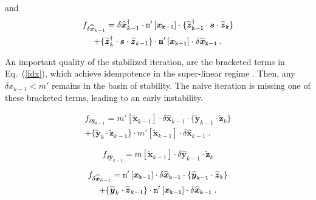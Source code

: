 \documentclass[letterpaper,twocolumn,amsmath,amsfont,amssymb,english,aps,jcp,preprintnumbers,groupaddress,nofootinbib,tightenlines]{revtex4}
\newcommand{\mat}[1]{\boldsymbol{#1}}
\newcommand{\mmat}[1]{\widetilde{\boldsymbol{#1}}}
\begin{document}
and 
\begin{multline} \label{fdx}
f_{\delta \widehat{\mat{x}}_{k-1}} 
= \delta \widehat{\mat{x}}^\dagger_{k-1} \cdot   \tt{m}'\left[\mat{x}_{k-1} \right] \cdot 
\{\widetilde{\mat{z}}^\dagger_{k-1}  \cdot \mat{s} \cdot \widetilde{\mat{z}}_{k} \}  \\
+ \{ \widetilde{\mat{z}}^\dagger_{k} \cdot \mat{s} \cdot  \widetilde{\mat{z}}_{k-1} \} 
\cdot \tt{m}'\left[\mat{x}_{k-1} \right]  \cdot \delta \widehat{\mat{x}}_{k-1}  \;.
\end{multline}

An important quality of the stabilized iteration, are the bracketed terms in Eq.~(\ref{fdx}), which
achieve idempotence in the super-linear regime \cite{}.  Then, any $\delta x_{k-1} < m' $ remains in the
basin of stability.  The naive iteration is missing one of these bracketed terms, leading to an early instability. 

\begin{multline} \label{fyzdx}
f_{\delta \widehat{\mat{x}}_{k-1}} 
= m'\left[\mmat{x}_{k-1} \right] 
\cdot \delta \widehat{\mat{x}}_{k-1} \cdot    
\{\widetilde{\mat{y}}_{k-1}  \cdot \widetilde{\mat{z}}_{k} \}  \\
+ \{ \widetilde{\mat{y}}_{k} \cdot \widetilde{\mat{z}}_{k-1} \} 
\cdot m'\left[\mmat{x}_{k-1} \right]  \cdot \delta \widehat{\mat{x}}_{k-1}  \;.
\end{multline}


\begin{equation} 
f_{\delta \widehat{\mat{y}}_{k-1}} 
= m\left[\mmat{x}_{k-1} \right] \cdot \delta \widehat{\mat{y}}_{k-1} \cdot  \widetilde{\mat{z}}_{k}  
\end{equation}


\begin{multline} \label{fyzdx}
f_{\delta \widehat{\mat{x}}_{k-1}} 
= \tt{m}'\left[\mat{x}_{k-1} \right] 
\cdot \delta \widehat{\mat{x}}_{k-1} \cdot    
\{\widetilde{\mat{y}}_{k-1}  \cdot \widetilde{\mat{z}}_{k} \}  \\
+ \{ \widetilde{\mat{y}}_{k} \cdot \widetilde{\mat{z}}_{k-1} \} 
\cdot \tt{m}'\left[\mat{x}_{k-1} \right]  \cdot \delta \widehat{\mat{x}}_{k-1}  \;.
\end{multline}


\end{document}
